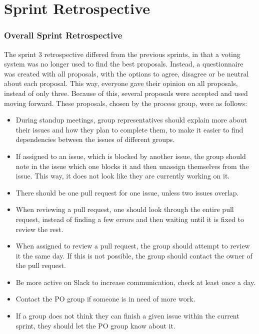 \section{Sprint Retrospective}

\subsubsection{Overall Sprint Retrospective}
The sprint 3 retrospective differed from the previous sprints, in that a voting system was no longer used to find the best proposals. Instead, a questionnaire was created with all proposals, with the options to agree, disagree or be neutral about each proposal.
This way, everyone gave their opinion on all proposals, instead of only three. Because of this, several proposals were accepted and used moving forward. These proposals, chosen by the process group, were as follows:

\begin{itemize}
    \item During standup meetings, group representatives should explain more about their issues and how they plan to complete them, to make it easier to find dependencies between the issues of different groups.
    \item If assigned to an issue, which is blocked by another issue, the group should note in the issue which one blocks it and then unassign themselves from the issue. This way, it does not look like they are currently working on it.
    \item There should be one pull request for one issue, unless two issues overlap.
    \item When reviewing a pull request, one should look through the entire pull request, instead of finding a few errors and then waiting until it is fixed to review the rest.
    \item When assigned to review a pull request, the group should attempt to review it the same day. If this is not possible, the group should contact the owner of the pull request. 
    \item Be more active on Slack to increase communication, check at least once a day.
    \item Contact the PO group if someone is in need of more work.
    \item If a group does not think they can finish a given issue within the current sprint, they should let the PO group know about it. 
\end{itemize}

